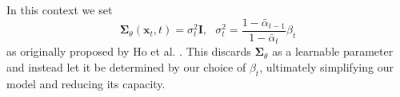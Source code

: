 \documentclass{report}
\begin{document}
In this context we set
\begin{equation} \label{eq:sigma}
    \bm{\Sigma}_{\theta}(\bm{x}_t, t) = \sigma_t^2\bm{I}, \ \ \ \sigma_t^2 = \frac{1-    \bar{\alpha}_{t-1}}{1-\bar{\alpha}_t}\beta_t    
\end{equation}
as originally proposed by Ho et al. \cite{ho2020denoising}. This discards $\bm{\Sigma}_{\theta}$ as a learnable parameter and instead let it be determined by our choice of $\beta_t$, ultimately simplifying our model and reducing its capacity. 
\end{document}
